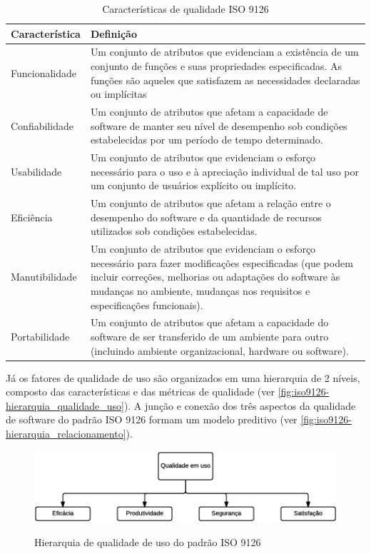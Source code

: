 \documentclass[
	12pt,				%
	openright,			%
	oneside,			%
	a4paper,			%
	english,			%
	brazil,				%
	]{abntex2}
\begin{document}
\begin{table}[h]
    \centering
    \caption{Características de qualidade ISO 9126}
    \label{tab:iso9126-caracteristicas}
    \begin{tabular}{p{3cm} p{12.0cm}}
        \toprule
        \textbf{Característica} & \textbf{Definição} \\ \midrule
        Funcionalidade & Um conjunto de atributos que evidenciam a existência de um conjunto de funções e suas propriedades especificadas. As funções são aqueles que satisfazem as necessidades declaradas ou implícitas \\
        \rowcolor[HTML]{EFEFEF}
        Confiabilidade & Um conjunto de atributos que afetam a capacidade de software de manter seu nível de desempenho sob condições estabelecidas por um período de tempo determinado. \\
        Usabilidade & Um conjunto de atributos que evidenciam o esforço necessário para o uso e à apreciação individual de tal uso por um conjunto de usuários explícito ou implícito. \\
        \rowcolor[HTML]{EFEFEF}
        Eficiência & Um conjunto de atributos que afetam a relação entre o desempenho do software e da quantidade de recursos utilizados sob condições estabelecidas. \\
        Manutibilidade & Um conjunto de atributos que evidenciam o esforço necessário para fazer modificações especificadas (que podem incluir correções, melhorias ou adaptações do software às mudanças no ambiente, mudanças nos requisitos e especificações funcionais). \\
        \rowcolor[HTML]{EFEFEF}
        Portabilidade & Um conjunto de atributos que afetam a capacidade do software de ser transferido de um ambiente para outro (incluindo ambiente organizacional, hardware ou software). \\ \bottomrule
    \end{tabular}
\end{table}

Já os fatores de qualidade de uso são organizados em uma hierarquia de 2 níveis, composto das características e das métricas de qualidade  (ver \autoref{fig:iso9126-hierarquia_qualidade_uso}). A junção e conexão dos três aspectos da qualidade de software do padrão ISO 9126 formam um modelo preditivo (ver \autoref{fig:iso9126-hierarquia_relacionamento}).

\begin{figure}[h]
    \centering
    \caption{Hierarquia de qualidade de uso do padrão ISO 9126}
    \graphicspath{ {./graphics/} }
    \includegraphics[scale=1.0]{iso9126-hierarquia_qualidade_uso-andrei}
    \label{fig:iso9126-hierarquia_qualidade_uso}
\end{figure}
\end{document}
